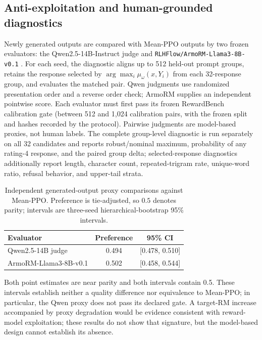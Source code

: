 \subsection{Anti-exploitation and human-grounded diagnostics}
\label{subsec:anti-exploitation}

Newly generated outputs are compared with Mean-PPO outputs by two frozen
evaluators: the Qwen2.5-14B-Instruct judge and
\texttt{RLHFlow/ArmoRM-Llama3-8B-v0.1}
\citep{zheng2023judging,wang2024interpretable}.  For each seed, the diagnostic
aligns up to 512 held-out prompt groups, retains the response selected by
$\arg\max_i\mu_\omega(x,Y_i)$ from each 32-response group, and evaluates the
matched pair.  Qwen judgments use randomized presentation order and a reverse
order check; ArmoRM supplies an independent pointwise score.  Each evaluator
must first pass its frozen RewardBench calibration gate (between 512 and 1,024
calibration pairs, with the frozen split and hashes recorded by the protocol).
Pairwise judgments are model-based proxies, not human labels.  The complete
group-level diagnostic is run separately on all 32 candidates and reports
robust/nominal maximum, probability of any rating-4 response, and the paired
group delta; selected-response diagnostics additionally report length,
character count, repeated-trigram rate, unique-word ratio, refusal behavior,
and upper-tail strata.

\begin{table}[H]
\caption{Independent generated-output proxy comparisons against Mean-PPO.
Preference is tie-adjusted, so $0.5$ denotes parity; intervals are three-seed
hierarchical-bootstrap 95\% intervals.}
\label{tab:proxy-diagnostics}
\centering\footnotesize
\begin{tabular}{lcc}
\toprule
Evaluator & Preference & 95\% CI\\
\midrule
Qwen2.5-14B judge & 0.494 & [0.478, 0.510]\\
ArmoRM-Llama3-8B-v0.1 & 0.502 & [0.458, 0.544]\\
\bottomrule
\end{tabular}
\end{table}

Both point estimates are near parity and both intervals contain 0.5. These
intervals establish neither a quality difference nor equivalence to Mean-PPO;
in particular, the Qwen proxy does not pass its declared gate.  A
target-RM increase accompanied by proxy degradation would be evidence
consistent with reward-model exploitation; these results do not show that
signature, but the model-based design cannot establish its absence.

